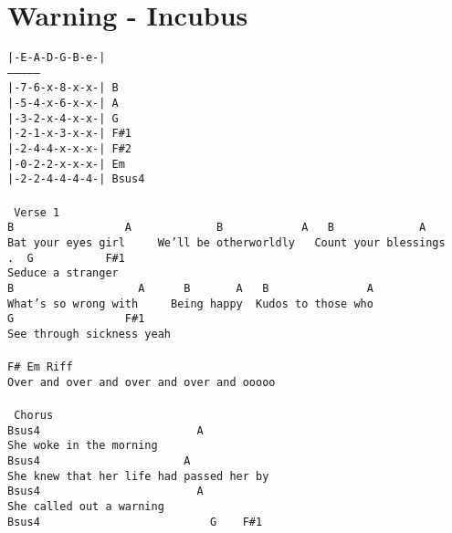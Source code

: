 \newpage
\section{Warning - Incubus}
\label{Warning - Incubus}
\texttt{|-E-A-D-G-B-e-|\\
---------------\\
|-7-6-x-8-x-x-|\ B\\
|-5-4-x-6-x-x-|\ A\\
|-3-2-x-4-x-x-|\ G\\
|-2-1-x-3-x-x-|\ F\#1\\
|-2-4-4-x-x-x-|\ F\#2\\
|-0-2-2-x-x-x-|\ Em\\
|-2-2-4-4-4-4-|\ Bsus4\\
\\
\lbrack\ Verse\ 1\rbrack\\
B\ \ \ \ \ \ \ \ \ \ \ \ \ \ \ \ \ A\ \ \ \ \ \ \ \ \ \ \ \ \ B\ \ \ \ \ \ \ \ \ \ \ \ A\ \ \ B\ \ \ \ \ \ \ \ \ \ \ \ \ A\\
Bat\ your\ eyes\ girl\ \ \ \ \ We'll\ be\ otherworldly\ \ \ Count\ your\ blessings\\
.\ \ G\ \ \ \ \ \ \ \ \ \ \ F\#1\\
Seduce\ a\ stranger\\
B\ \ \ \ \ \ \ \ \ \ \ \ \ \ \ \ \ \ \ A\ \ \ \ \ \ B\ \ \ \ \ \ \ A\ \ \ B\ \ \ \ \ \ \ \ \ \ \ \ \ \ \ A\\
What's\ so\ wrong\ with\ \ \ \ \ Being\ happy\ \ Kudos\ to\ those\ who\\
G\ \ \ \ \ \ \ \ \ \ \ \ \ \ \ \ \ F\#1\\
See\ through\ sickness\ yeah\\
\\
F\#\ Em\ Riff\\
Over\ and\ over\ and\ over\ and\ over\ and\ ooooo\\
\\
\lbrack\ Chorus\rbrack\\
Bsus4\ \ \ \ \ \ \ \ \ \ \ \ \ \ \ \ \ \ \ \ \ \ \ \ A\\
She\ woke\ in\ the\ morning\\
Bsus4\ \ \ \ \ \ \ \ \ \ \ \ \ \ \ \ \ \ \ \ \ \ A\\
She\ knew\ that\ her\ life\ had\ passed\ her\ by\\
Bsus4\ \ \ \ \ \ \ \ \ \ \ \ \ \ \ \ \ \ \ \ \ \ \ \ A\\
She\ called\ out\ a\ warning\\
Bsus4\ \ \ \ \ \ \ \ \ \ \ \ \ \ \ \ \ \ \ \ \ \ \ \ \ \ G\ \ \ \ F\#1\\
}
